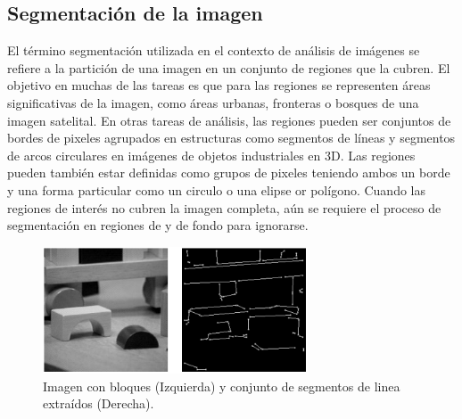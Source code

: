         \subsection{Segmentación de la imagen}
            El término segmentación utilizada en el contexto de análisis de imágenes se refiere a la partición de una imagen en un conjunto de regiones que la cubren. El objetivo en muchas de las tareas es que para las regiones se representen áreas significativas de la imagen, como áreas urbanas, fronteras o bosques de una imagen satelital. En otras tareas de análisis, las regiones pueden ser conjuntos de bordes de pixeles agrupados en estructuras como segmentos de líneas y segmentos de arcos circulares en imágenes de objetos industriales en 3D. Las regiones pueden también estar definidas como grupos de pixeles teniendo ambos un borde y una forma particular como un circulo o una elipse or polígono. Cuando las regiones de interés no cubren la imagen completa, aún se requiere el proceso de segmentación en regiones de y de fondo para ignorarse. 
            \cite{imgAnalySeg}
            \begin{figure}[H]
                \centering
                \includegraphics[width=0.7\textwidth]{capitulo2/images/segmentation.PNG}
                \caption{Imagen con bloques (Izquierda) y conjunto de segmentos de linea extraídos (Derecha).}
                \label{fig:segmentacion}
            \end{figure}
            


